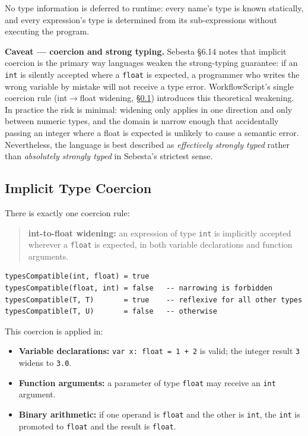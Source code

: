 \documentclass[10pt,a4paper]{article}
\begin{document}
No type information is deferred to runtime: every name's type is known statically, and every
expression's type is determined from its sub-expressions without executing the program.

\textbf{Caveat --- coercion and strong typing.}
Sebesta \S6.14 notes that implicit coercion is the primary way languages weaken the
strong-typing guarantee: if an \texttt{int} is silently accepted where a \texttt{float} is
expected, a programmer who writes the wrong variable by mistake will not receive a type error.
WorkflowScript's single coercion rule (int$\to$float widening, \S\ref{subsec:coercion})
introduces this theoretical weakening. In practice the risk is minimal: widening only applies
in one direction and only between numeric types, and the domain is narrow enough that
accidentally passing an integer where a float is expected is unlikely to cause a semantic
error. Nevertheless, the language is best described as \textit{effectively strongly typed}
rather than \textit{absolutely strongly typed} in Sebesta's strictest sense.

\subsection{Implicit Type Coercion}
\label{subsec:coercion}

There is exactly one coercion rule:

\begin{quote}
\textbf{int-to-float widening:} an expression of type \texttt{int} is implicitly accepted
wherever a \texttt{float} is expected, in both variable declarations and function arguments.
\end{quote}

\begin{lstlisting}[language={}, caption={Type compatibility function}]
typesCompatible(int, float) = true
typesCompatible(float, int) = false   -- narrowing is forbidden
typesCompatible(T, T)       = true    -- reflexive for all other types
typesCompatible(T, U)       = false   -- otherwise
\end{lstlisting}

This coercion is applied in:

\begin{itemize}
    \item \textbf{Variable declarations:} \texttt{var x: float = 1 + 2} is valid; the integer
          result \texttt{3} widens to \texttt{3.0}.
    \item \textbf{Function arguments:} a parameter of type \texttt{float} may receive an
          \texttt{int} argument.
    \item \textbf{Binary arithmetic:} if one operand is \texttt{float} and the other is
          \texttt{int}, the \texttt{int} is promoted to \texttt{float} and the result is
          \texttt{float}.
\end{itemize}
\end{document}
